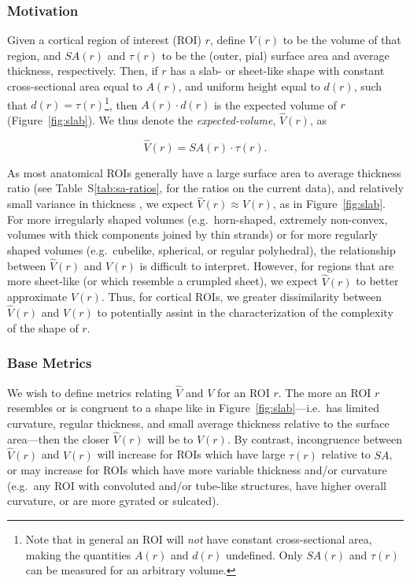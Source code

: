 \documentclass{article}
\begin{document}
\subsubsection{Motivation}

Given a cortical region of interest (ROI) \(r\), define \(V(r)\) to be the
volume of that region, and \(SA(r)\) and \(\tau(r)\) to be the (outer, pial)
surface area and average thickness, respectively. Then, if \(r\) has a slab-
or sheet-like shape with constant cross-sectional area equal to \(A(r)\), and
uniform height equal to \(d(r)\), such that \(d(r) = \tau(r)\)\footnote{Note
that in general an ROI will \emph{not} have constant cross-sectional area,
making the quantities \(A(r)\) and \(d(r)\) undefined. Only \(SA(r)\) and
\(\tau(r)\) can be measured for an arbitrary volume.}, then
\(A(r) \cdot d(r)\) is the expected volume of \(r\) (Figure~\ref{fig:slab}).
We thus denote the \emph{expected-volume}, \(\hat{V}(r)\), as

\begin{equation}
\hat{V}(r) = SA(r) \cdot \tau(r).
\end{equation}

As most anatomical ROIs generally have a large surface area to average
thickness ratio (see Table~S\ref{tab:sa-ratios}, for the ratios on the
current data), and relatively small variance in thickness
\citep{imBrainSizeCortical2008}, we expect \(\hat{V}(r) \approx V(r)\), as in
Figure~\ref{fig:slab}. For more irregularly shaped volumes (e.g.\
horn-shaped, extremely non-convex, volumes with thick components joined by
thin strands) or for more regularly shaped volumes (e.g.\ cubelike,
spherical, or regular polyhedral), the relationship between \(\hat{V}(r)\)
and \(V(r)\) is difficult to interpret. However, for regions that are more
sheet-like (or which resemble a crumpled sheet), we expect \(\hat{V}(r)\) to
better approximate \(V(r)\). Thus, for cortical ROIs, we greater
dissimilarity between \(\hat{V}(r)\) and \(V(r)\) to potentially assint in
the characterization of the complexity of the shape of \(r\).


\subsubsection{Base Metrics}

We wish to define metrics relating \(\hat{V}\) and \(V\) for an ROI  \(r\).
The more an ROI \(r\) resembles or is congruent to a shape like in
Figure~\ref{fig:slab}---i.e.\ has limited curvature, regular thickness, and
small average thickness relative to the surface area---then the closer
\(\hat{V}(r)\) will be to \(V(r)\). By contrast, incongruence between
\(\hat{V}(r)\) and \(V(r)\) will increase for ROIs which
have large \(\tau(r)\) relative to \(SA\), or may increase for ROIs
which have more variable thickness and/or curvature (e.g.\ any ROI with
convoluted and/or tube-like structures, have higher overall curvature, or are
more gyrated or sulcated).
\end{document}
